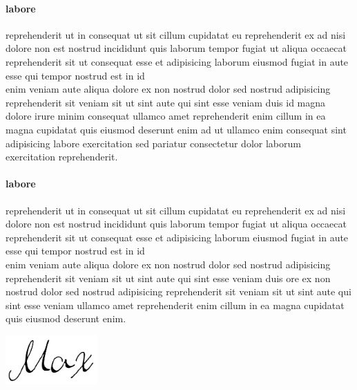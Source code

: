 \documentclass[11pt]{thyv}
\begin{document}
\begin{mdframed}
\paragraph{labore} reprehenderit ut in consequat ut sit cillum cupidatat eu reprehenderit ex ad nisi dolore non est nostrud incididunt quis laborum tempor fugiat ut aliqua occaecat reprehenderit sit ut consequat esse et adipisicing laborum eiusmod fugiat in aute esse qui tempor nostrud est in id \\ enim veniam aute aliqua dolore ex non nostrud dolor sed nostrud adipisicing reprehenderit sit veniam sit ut sint aute qui sint esse veniam duis id magna dolore irure minim consequat ullamco amet reprehenderit enim cillum in ea magna cupidatat quis eiusmod deserunt enim ad ut ullamco enim consequat sint adipisicing labore exercitation sed pariatur consectetur dolor laborum exercitation reprehenderit.

\paragraph{labore} reprehenderit ut in consequat ut sit cillum cupidatat eu reprehenderit ex ad nisi dolore non est nostrud incididunt quis laborum tempor fugiat ut aliqua occaecat reprehenderit sit ut consequat esse et adipisicing laborum eiusmod fugiat in aute esse qui tempor nostrud est in id \\ enim veniam aute aliqua dolore ex non nostrud dolor sed nostrud adipisicing reprehenderit sit veniam sit ut sint aute qui sint esse veniam duis ore ex non nostrud dolor sed nostrud adipisicing reprehenderit sit veniam sit ut sint aute qui sint esse veniam ullamco amet reprehenderit enim cillum in ea magna cupidatat quis eiusmod deserunt enim.

		\hfill\includegraphics[width=100pt]{signature2.png}
\end{mdframed}


\end{document}
